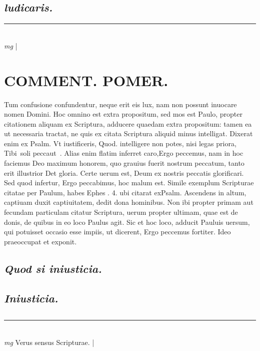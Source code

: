 \documentclass{article}
\begin{document}
\begin{pages}
\subsection*{\textit{ludicaris. }}\pstart  \pend
\vspace{0.5cm}\noindent
\vspace{0.2cm}\rule{1cm}{0.2pt}\\ 
\hspace{0.2cm}\textit{mg}
\footnotesize 
\normalsize| 
\section*{COMMENT. POMER.  }\pstart Tum confusione confundentur, neque erit eis lux, nam non possunt inuocare nomen Domini.  \pend\pstart Hoc omnino est extra propositum, sed mos est Paulo, propter citationem aliquam ex Scriptura, adducere quaedam extra propositum: tamen ea ut necessaria tractat, ne quis ex citata Scriptura aliquid minus intelligat. Dixerat enim ex Psalm. Vt iustificeris, Quod. intelligere non potes, nisi legas priora, Tibi soli peccaut . Alias enim flatim inferret caro,Ergo peccemus, nam in hoc faciemus Deo maximum honorem, quo grauius fuerit nostrum peccatum, tanto erit illustrior Det gloria. Certe uerum est, Deum ex nostris peccatis glorificari. Sed quod infertur, Ergo peccabimus, hoc malum est. Simile exemplum Scripturae citatae per Paulum, habes Ephes . 4. ubi citarat exPsalm. Ascendens in altum, captiuam duxit captiuitatem, dedit dona hominibus. Non ibi propter primam aut fecundam particulam citatur Scriptura, uerum propter ultimam, quae est de donis, de quibus in eo loco Paulus agit. Sic et hoc loco, adducit Pauluis uersum, qui potuisset occasio esse impiis, ut dicerent, Ergo peccemus fortiter. Ideo praeoccupat et exponit.   \pend
{}
{}
\subsection*{\textit{Quod si iniusticia. }}
{}
\subsection*{\textit{Iniusticia. }}\pstart  \pend
{}
{}
\subsection*{\textit{}}\pstart  \pend
\vspace{0.5cm}\noindent
\vspace{0.2cm}\rule{1cm}{0.2pt}\\ 
\hspace{0.2cm}\textit{mg}
\footnotesize Verus sensus Scripturae.  
\normalsize| 

\end{pages}
\end{document}
